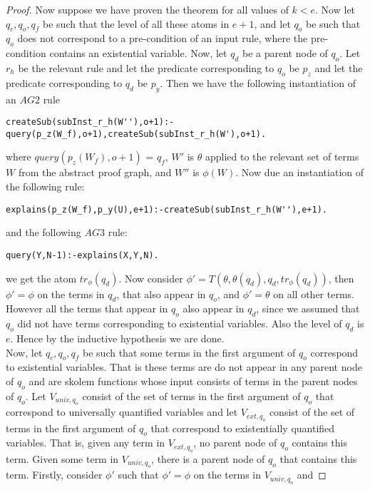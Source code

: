 \begin{proof}
Now suppose we have proven the theorem for all values of $k<e$. Now let $q_{c},q_{o},q_{f}$ be such that the level of all these atoms in $e+1$, and let $q_{o}$ be such that $q_{o}$ does not correspond to a pre-condition of an input rule, where the pre-condition contains an existential variable. Now, let $q_{d}$ be a parent node of $q_{o}$. Let $r_{h}$ be the relevant rule and let the predicate corresponding to $q_{o}$ be $p_{z}$ and let the predicate corresponding to $q_{d}$ be $p_{y}$. Then we have the following instantiation of an $AG2$ rule 
\begin{lstlisting}[frame=none]
createSub(subInst_r_h(W''),o+1):-
query(p_z(W_f),o+1),createSub(subInst_r_h(W'),o+1).
\end{lstlisting}
where $query(p_{z}(W_{f}),o+1)$ = $q_{f}$, $W'$ is $\theta$ applied to the relevant set of terms $W$ from the abstract proof graph, and $W''$ is $\phi(W)$. Now due an instantiation of the following rule:
\begin{lstlisting}[frame=none]
explains(p_z(W_f),p_y(U),e+1):-createSub(subInst_r_h(W''),e+1).
\end{lstlisting}
and the following $AG3$ rule:
\begin{lstlisting}[frame=none]
query(Y,N-1):-explains(X,Y,N). 
\end{lstlisting}
we get the atom $tr_{\phi}(q_{d})$. Now consider
$\phi'= T(\theta, \theta(q_{d}), q_{d}, tr_{\phi}(q_{d}))$, then $\phi'=\phi$
on the terms in $q_{d}$, that also appear in $q_{o}$, and $\phi' = \theta$ on
all other terms. However all the terms that appear in $q_{o}$ also appear in
$q_{d}$, since we assumed that $q_{o}$ did not have terms corresponding to
existential variables. Also the level of $q_{d}$ is $e$. Hence by the
inductive hypothesis we are done.\\
Now, let $q_{c},q_{o},q_{f}$ be such that
some terms in the first argument of $q_{o}$ correspond to existential
variables. That is these terms are do not appear in any parent node of $q_{o}$
and are skolem functions whose input consists of terms in the parent nodes of
$q_{o}$. Let $V_{univ,q_{o}}$ consist of the set of terms in the first
argument of $q_{o}$ that correspond to universally quantified variables and
let $V_{ext,q_{o}}$ consist of the set of terms in the first argument of
$q_{o}$ that correspond to existentially quantified variables. That is, given any term in $V_{ext,q_{o}}$, no parent node of $q_{o}$ contains this term. Given some term in $V_{univ,q_{o}}$, there is a parent node of $q_{o}$ that contains this term.   Firstly, consider $\phi'$ such that $\phi'=\phi$ on the terms in $V_{univ,q_{o}}$ and

\end{proof}
